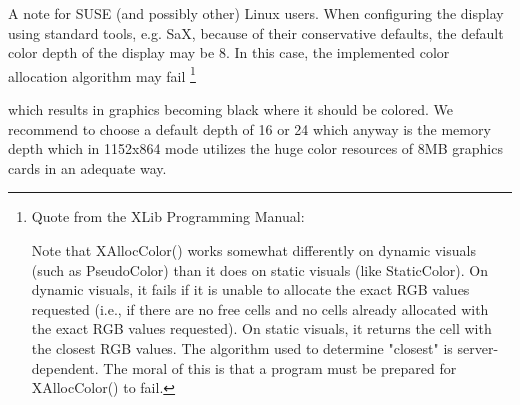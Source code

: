 \begin{description}
A note for SUSE (and possibly other) Linux users. When configuring the
display using standard tools, e.g.  SaX, because of their conservative
defaults, the default  color depth of the  display may be 8.   In this
case, the  implemented  color allocation   algorithm   may fail
\footnote{
Quote from the XLib Programming Manual:

Note that XAllocColor() works somewhat  differently on dynamic visuals
(such  as PseudoColor)    than  it  does   on  static  visuals   (like
StaticColor).  On dynamic  visuals,   it fails  if  it  is  unable  to
allocate the exact RGB values  requested (i.e., if  there are no  free
cells   and  no cells already    allocated with the   exact RGB values
requested).  On  static visuals, it  returns the cell with the closest
RGB   values.      The algorithm  used    to  determine   "closest" is
server-dependent.   The   moral of  this is  that    a program must be
prepared for XAllocColor() to fail. 

}

  which
results  in graphics becoming  black where it  should  be colored.  We
recommend to choose  a default depth of 16  or 24 which  anyway is the
memory depth which in 1152x864  mode utilizes the huge color resources
of 8MB graphics cards in an adequate way. 


\end{description}



\newpage



